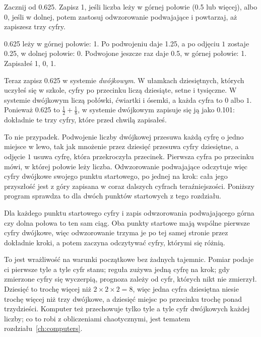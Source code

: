 \begin{think}
Zacznij od \num{0.625}. Zapisz 1, jeśli liczba leży w górnej połowie
(\num{0.5} lub więcej), albo 0, jeśli w dolnej, potem zastosuj
odwzorowanie podwajające i powtarzaj, aż zapiszesz trzy cyfry.
\end{think}
\begin{revealblock}
\num{0.625} leży w górnej połowie: 1. Po podwojeniu daje \num{1.25}, a po
odjęciu $1$ zostaje \num{0.25}, w dolnej połowie: 0. Podwojone jeszcze raz
daje \num{0.5}, w górnej połowie: 1. Zapisałeś 1, 0, 1.
\end{revealblock}
Teraz zapisz \num{0.625} w systemie \emph{dwójkowym}. W ułamkach
dziesiętnych, których uczyłeś się w szkole, cyfry po przecinku liczą
dziesiąte, setne i tysięczne. W systemie dwójkowym liczą połówki, ćwiartki
i ósemki, a każda cyfra to $0$ albo $1$. Ponieważ \num{0.625} to
$\tfrac12 + \tfrac18$, w systemie dwójkowym zapisuje się ją jako
\num{0.101}: dokładnie te trzy cyfry, które przed chwilą zapisałeś.

To nie przypadek. Podwojenie liczby dwójkowej przesuwa każdą cyfrę o jedno
miejsce w lewo, tak jak mnożenie przez dziesięć przesuwa cyfry dziesiętne, a
odjęcie $1$ usuwa cyfrę, która przekroczyła przecinek. Pierwsza cyfra po
przecinku mówi, w której połowie leży liczba. Odwzorowanie podwajające
odczytuje więc cyfry dwójkowe swojego punktu startowego, po jednej na krok:
cała jego przyszłość jest z góry zapisana w coraz dalszych cyfrach
teraźniejszości. Poniższy program sprawdza to dla dwóch punktów startowych z
tego rozdziału.



\noindent
Dla każdego punktu startowego cyfry i zapis odwzorowania podwajającego
\dash{} górna czy dolna połowa \dash{} to ten sam ciąg. Oba punkty startowe
mają wspólne pierwsze  cyfry dwójkowe, więc
odwzorowanie trzyma je po tej samej stronie przez dokładnie
 kroki, a potem zaczyna odczytywać cyfry, którymi się
różnią.

To jest wrażliwość na warunki początkowe bez żadnych tajemnic. Pomiar podaje
ci pierwsze tyle a tyle cyfr stanu; reguła zużywa jedną cyfrę na krok; gdy
zmierzone cyfry się wyczerpią, prognoza zależy od cyfr, których nikt nie
zmierzył. Dziesięć to trochę więcej niż $2 \times 2 \times 2 = 8$, więc
jedna cyfra dziesiętna niesie trochę więcej niż trzy dwójkowe, a dziesięć
miejsc po przecinku \dash{} trochę ponad trzydzieści. Komputer też
przechowuje tylko tyle a tyle cyfr dwójkowych każdej liczby; co to robi z
obliczeniami chaotycznymi, jest tematem rozdziału~\ref{ch:computers}.

